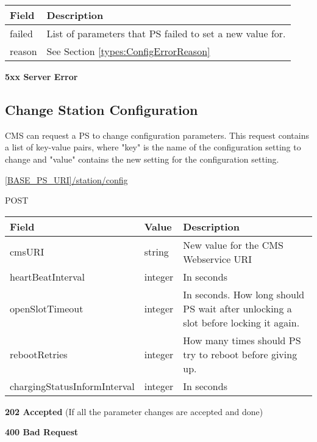 \begin{tabularx}{\linewidth}{ | l | X | }
  \hline
  \rowcolor{table-head}
  Field & Description \\
  \hline
  failed		& List of parameters that \acs{PS} failed to set a new value for.\\
  reason 	& See Section \ref{types:ConfigErrorReason} \\
  \hline
\end{tabularx}

\textbf{5xx Server Error}

\subsection{Change Station Configuration}
\label{cms:change-conf}

\acs{CMS} can request a \acs{PS} to change configuration parameters. This request contains a list of key-value pairs, where "key" is the name of the configuration setting to change and "value" contains the new setting for the configuration setting.

 \url{[BASE_PS_URI]/station/config}

 POST

\begin{table}[!h]
\vspace{-7mm}
\begin{tabularx}{\linewidth}{ | l | l | X | }
  \hline
  \rowcolor{table-head}
  Field & Value & Description \\
  \hline
  cmsURI 			& string 		& New value for the \acs{CMS} Webservice URI \\
  heartBeatInterval 			& integer 		& In seconds \\
  openSlotTimeout 			& integer 		& In seconds. How long should \acs{PS} wait after unlocking a slot before locking it again. \\
  rebootRetries 				& integer 		& How many times should \acs{PS} try to reboot before giving up.\\
  chargingStatusInformInterval 	& integer 		& In seconds \\
  \hline
\end{tabularx}
\end{table}

\textbf{202 Accepted} (If all the parameter changes are accepted and done)

 \textbf{400 Bad Request}

